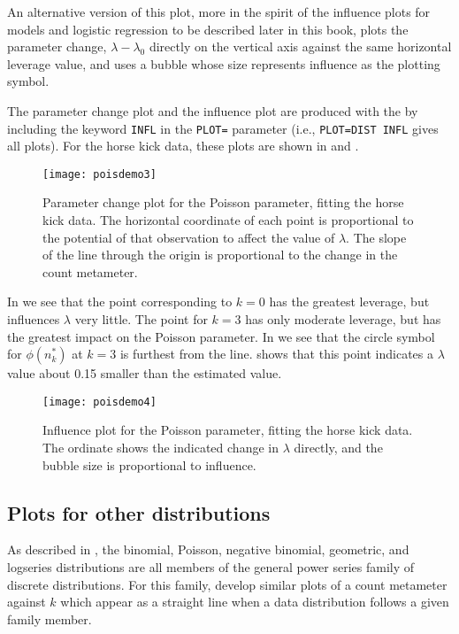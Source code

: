 An alternative version of this plot, more in the spirit of the
influence plots for \loglin{} models and logistic regression
to be described later in this book, plots the
parameter change, $\lambda - \lambda_0$ directly on the
vertical axis against the same horizontal leverage value,
and uses a bubble whose size represents influence
as the plotting symbol.

The parameter change plot and the influence plot are produced
with the  by including the keyword
\texttt{INFL} in the \texttt{PLOT=} parameter (i.e., \texttt{PLOT=DIST INFL}
gives all plots).
For the horse kick data, these plots are shown in
 and .

\begin{figure}[htb]
  \centering
  \texttt{[image: poisdemo3]}
  \caption[Parameter change plot for the Poisson parameter]{Parameter change
plot for the Poisson parameter, fitting the horse kick data.
The horizontal coordinate of each point is proportional to the potential of that observation to affect the value of $\lambda$.
The slope of the line through the origin is proportional to the
change in the count metameter.}\label{fig:poisdemo3}
\end{figure}
In  we see that
the point corresponding to $k=0$ has the greatest leverage, but
influences $\lambda$ very little.
The point for $k=3$ has only moderate leverage, but has the greatest
impact on the Poisson parameter.
In 
we see that the circle symbol for $\phi(n_k^{*})$
at $k=3$ is furthest from the
line.
 shows that this point indicates a $\lambda$
value about 0.15 smaller than the estimated value.
\begin{figure}[htb]
  \centering
  \texttt{[image: poisdemo4]}
  \caption[Influence plot for the Poisson parameter]{Influence plot
for the Poisson parameter, fitting the horse kick data.
  The ordinate shows the indicated change in $\lambda$
directly, and the bubble size is proportional to
influence.}\label{fig:poisdemo4} \end{figure}



\subsection{Plots for other distributions}\label{sec:discrete-other}
As described in , the binomial, Poisson, negative binomial,
geometric, and logseries distributions are all members of the
general  power series family of discrete distributions.
For this family, \citet{HoaglinTukey:85} develop similar plots
of a count metameter against $k$ which appear as a straight line
when a data distribution follows a given family member.

